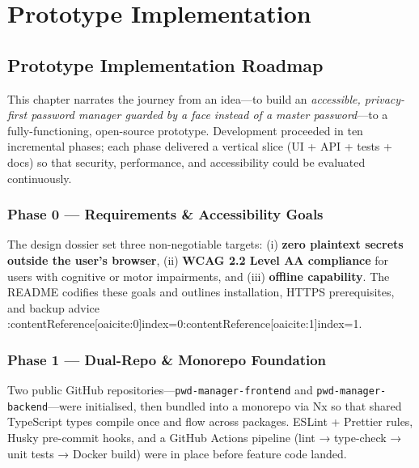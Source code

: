 
\chapter{Prototype Implementation}%
\label{ch:implementatie}


\section{Prototype Implementation Roadmap}
\label{sec:impl-roadmap}
This chapter narrates the journey from an idea—to build an
\emph{accessible, privacy-first password manager guarded by a face
instead of a master password}—to a fully-functioning, open-source
prototype.  Development proceeded in ten incremental phases; each phase
delivered a vertical slice (UI + API + tests + docs) so that security,
performance, and accessibility could be evaluated continuously.

\subsection{Phase 0 — Requirements \& Accessibility Goals}
The design dossier set three non-negotiable targets: (i) \textbf{zero
plaintext secrets outside the user's browser}, (ii) \textbf{WCAG 2.2
Level AA compliance} for users with cognitive or motor impairments, and
(iii) \textbf{offline capability}.  The README codifies these goals and
outlines installation, HTTPS prerequisites, and backup advice
:contentReference[oaicite:0]{index=0}:contentReference[oaicite:1]{index=1}.

\subsection{Phase 1 — Dual-Repo \& Monorepo Foundation}
Two public GitHub repositories—\texttt{pwd-manager-frontend} and
\texttt{pwd-manager-backend}—were initialised, then bundled into a
monorepo via Nx so that shared TypeScript types compile once and flow
across packages.  ESLint + Prettier rules, Husky pre-commit hooks, and a
GitHub Actions pipeline (lint → type-check → unit tests → Docker build)
were in place before feature code landed.

